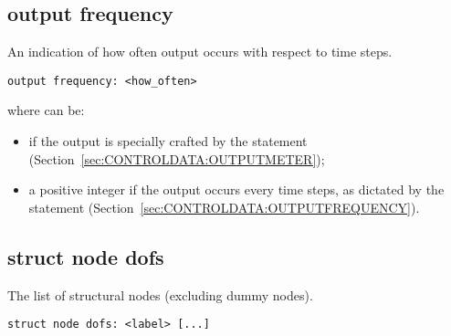 \subsection{output frequency}
An indication of how often output occurs with respect to time steps.
\begin{verbatim}
output frequency: <how_often>
\end{verbatim}
where  can be:
\begin{itemize}
\item {} if the output is specially crafted by the
 statement (Section~\ref{sec:CONTROLDATA:OUTPUTMETER});
\item a positive integer if the output occurs every 
time steps, as dictated by the  statement
(Section~\ref{sec:CONTROLDATA:OUTPUTFREQUENCY}).
\end{itemize}

\subsection{struct node dofs}
The list of structural nodes (excluding dummy nodes).
\begin{verbatim}
struct node dofs: <label> [...]
\end{verbatim}

